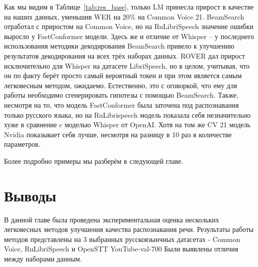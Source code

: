 Как мы видим в Таблице~\ref{tab:res_base}, только LM принесла прирост в качестве на наших данных, уменьшив WER на 20\% на Common Voice 21.
BeamSearch отработал с приростом на Common Voice, но на RuLibriSpeech значение ошибки выросло у FastConformer модели.
Здесь же и отличие от Whisper -- у последнего использования методики декодирования BeamSearch привело к улучшению результатов декодирования на всех трёх наборах данных.
ROVER дал прирост исключительно для Whisper на датасете LibriSpeech, но в целом, учитывая, что он по факту берёт просто самый вероятный токен и при этом является самым легковесным методом, ожидаемо.
Естественно, это с оговоркой, что ему для работы необходимо сгенерировать гипотезы с помощью BeamSearch.
Также, несмотря на то, что модель FastConformer была заточена под распознавания только русского языка, но на RuLibrispeech модель показала себя незначительно хуже в сравнение c моделью Whisper от OpenAI.
Хотя на том же CV 21 модель Nvidia показывает себя лучше, несмотря на разницу в 10 раз в количестве параметров.

Более подробно примеры мы разберём в следующей главе.

\section{Выводы}
В данной главе была проведена экспериментальная оценка нескольких легковесных методов улучшения качества распознавания речи.
Результаты работы методов представлены на 3 выбранных русскоязынчных датасетах - Common Voice, RuLibriSpeech и OpenSTT YouTube-val-700
Были выявлены отличия между наборами данным.